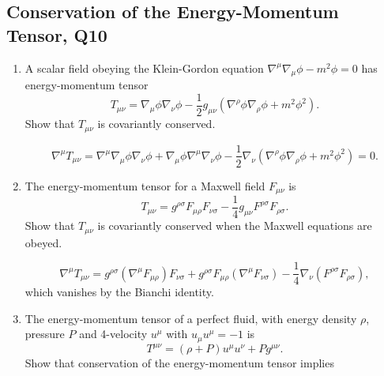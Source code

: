 \subsection{Conservation of the Energy-Momentum Tensor, Q10}

\begin{enumerate}[label=\roman*)]
    \item A scalar field obeying the Klein-Gordon equation $\nabla^\mu\nabla_\mu\phi - m^2\phi = 0$ has energy-momentum tensor
    \begin{equation}
        T_{\mu\nu} = \nabla_\mu\phi\nabla_\nu\phi - \frac{1}{2}g_{\mu\nu}\left(\nabla^\rho\phi\nabla_\rho\phi + m^2\phi^2\right).
    \end{equation}
    Show that $T_{\mu\nu}$ is covariantly conserved.
    \begin{solution}
        \begin{equation}
            \nabla^\mu T_{\mu\nu} = \nabla^\mu \nabla_\mu \phi \nabla_\nu \phi + \nabla_\mu \phi \nabla^\mu \nabla_\nu\phi -\frac{1}{2}\nabla_\nu\left(\nabla^\rho\phi\nabla_\rho\phi + m^2\phi^2\right) = 0.
        \end{equation}
    \end{solution}
    \item The energy-momentum tensor for a Maxwell field $F_{\mu\nu}$ is
    \begin{equation}
        T_{\mu\nu} = g^{\rho\sigma}F_{\mu\rho}F_{\nu\sigma} - \frac{1}{4}g_{\mu\nu}F^{\rho\sigma}F_{\rho\sigma}.
    \end{equation}
    Show that $T_{\mu\nu}$ is covariantly conserved when the Maxwell equations are obeyed.
    \begin{solution}
        \begin{equation}
            \nabla^\mu T_{\mu\nu} = g^{\rho\sigma}(\nabla^\mu F_{\mu\rho}) F_{\nu\sigma } + g^{\rho\sigma} F_{\mu\rho}(\nabla^\mu F_{\nu\sigma })- \frac{1}{4}\nabla_\nu(F^{\rho\sigma}F_{\rho\sigma}),
        \end{equation}
        which vanishes by the Bianchi identity.
    \end{solution}
    \item The energy-momentum tensor of a perfect fluid, with energy density $\rho$, pressure $P$ and 4-velocity $u^\mu$ with $u_\mu u^\mu = -1$ is
    \begin{equation}
        T^{\mu\nu} = (\rho+P)u^\mu u^\nu + Pg^{\mu\nu}.
    \end{equation}
    Show that conservation of the energy-momentum tensor implies

\end{enumerate}
